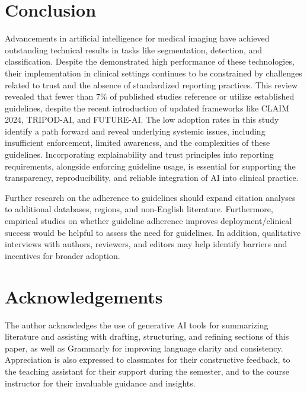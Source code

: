 \documentclass{article}
\begin{document}
\section{Conclusion}
Advancements in artificial intelligence for medical imaging have achieved outstanding technical results in tasks like segmentation, detection, and classification. Despite the demonstrated high performance of these technologies, their implementation in clinical settings continues to be constrained by challenges related to trust and the absence of standardized reporting practices. This review revealed that fewer than 7\% of published studies reference or utilize established guidelines, despite the recent introduction of updated frameworks like CLAIM 2024, TRIPOD-AI, and FUTURE-AI. The low adoption rates in this study identify a path forward and reveal underlying systemic issues, including insufficient enforcement, limited awareness, and the complexities of these guidelines. Incorporating explainability and trust principles into reporting requirements, alongside enforcing guideline usage, is essential for supporting the transparency, reproducibility, and reliable integration of AI into clinical practice.

Further research on the adherence to guidelines should expand citation analyses to additional databases, regions, and non-English literature. Furthermore, empirical studies on whether guideline adherence improves deployment/clinical success would be helpful to assess the need for guidelines. In addition, qualitative interviews with authors, reviewers, and editors may help identify barriers and incentives for broader adoption.

\section{Acknowledgements}
The author acknowledges the use of generative AI tools for summarizing literature and assisting with drafting, structuring, and refining sections of this paper, as well as Grammarly for improving language clarity and consistency. Appreciation is also expressed to classmates for their constructive feedback,  to the teaching assistant for their support during the semester, and to the course instructor for their invaluable guidance and insights.



\end{document}
